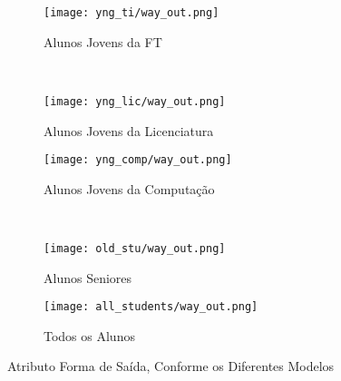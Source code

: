 \clearpage
\begin{figure}[!ht]
    \centering
    \begin{subfigure}[b]{0.48\textwidth}
        \centering
        \texttt{[image: yng\_ti/way\_out.png]}
        \caption{Alunos Jovens da FT}
    \end{subfigure}
    ~
    \begin{subfigure}[b]{0.48\textwidth}
        \centering
        \texttt{[image: yng\_lic/way\_out.png]}
        \caption{Alunos Jovens da Licenciatura}
    \end{subfigure}

    \begin{subfigure}[b]{0.48\textwidth}
        \centering
        \texttt{[image: yng\_comp/way\_out.png]}
        \caption{Alunos Jovens da Computação}
    \end{subfigure}
    ~
    \begin{subfigure}[b]{0.48\textwidth}
        \centering
        \texttt{[image: old\_stu/way\_out.png]}
        \caption{Alunos Seniores}
    \end{subfigure}

    \begin{subfigure}[b]{0.48\textwidth}
        \centering
        \texttt{[image: all\_students/way\_out.png]}
        \caption{Todos os Alunos}
    \end{subfigure}
    \caption{Atributo Forma de Saída, Conforme os Diferentes Modelos}
\end{figure}

